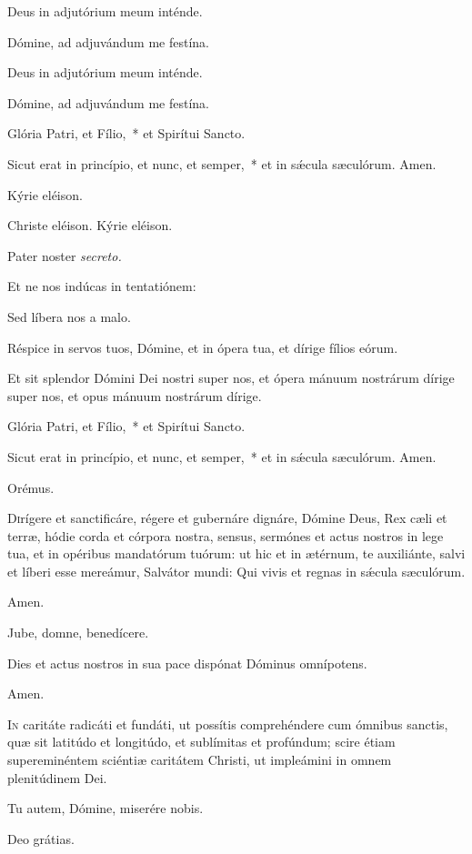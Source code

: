 \vv Deus in adjutórium meum inténde.

\rr Dómine, ad adjuvándum me festína.

\vv Deus in adjutórium meum inténde.

\rr Dómine, ad adjuvándum me festína.

\vv Glória Patri, et Fílio,~* et Spirítui Sancto.

\rr Sicut erat in princípio, et nunc, et semper,~* et in sǽcula sæculórum. Amen.

\vv Kýrie eléison.

\rr Christe eléison. Kýrie eléison.

\vv Pater noster \textit{secreto.}

\vv Et ne nos indúcas in tentatiónem:

\rr Sed líbera nos a malo.

\vv Réspice in servos tuos, Dómine, et in ópera tua, et dírige fílios eórum.

\rr Et sit splendor Dómini Dei nostri super nos, et ópera mánuum nostrárum
dírige super nos, et opus mánuum nostrárum dírige.

\vv Glória Patri, et Fílio,~* et Spirítui Sancto.

\rr Sicut erat in princípio, et nunc, et semper,~* et in sǽcula sæculórum. Amen.

Orémus.

\lettrine{D}{i}rígere et sanctificáre, régere et gubernáre dignáre, Dómine Deus, Rex
cæli et terræ, hódie corda et córpora nostra, sensus, sermónes et actus nostros in
lege tua, et in opéribus mandatórum tuórum: ut hic et in ætérnum, te auxiliánte,
salvi et líberi esse mereámur, Salvátor mundi: Qui vivis et regnas in sǽcula
sæculórum.

\rr Amen.

\vv Jube, domne, benedícere.


Dies et actus nostros in sua pace dispónat Dóminus omnípotens.

\rr Amen.

\lettrine{I}{n} caritáte radicáti et fundáti, ut possítis comprehéndere cum ómnibus sanctis, quæ sit latitúdo et longitúdo, et sublímitas et profúndum; scire étiam supereminéntem sciéntiæ caritátem Christi, ut impleámini in omnem plenitúdinem Dei.

\vv Tu autem, Dómine, miserére nobis.

\rr Deo grátias.

